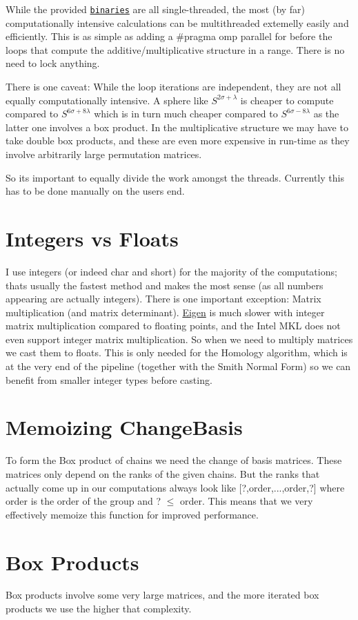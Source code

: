 \begin{DoxyItemize}
\item While the provided \href{https://github.com/NickG-Math/Mackey/tree/master/bin}{\tt binaries} are all single-\/threaded, the most (by far) computationally intensive calculations can be multithreaded extemelly easily and efficiently. This is as simple as adding a {\ttfamily \#pragma omp parallel for} before the loops that compute the additive/multiplicative structure in a range. There is no need to lock anything.
\item There is one caveat\+: While the loop iterations are independent, they are not all equally computationally intensive. A sphere like $S^{2\sigma+\lambda}$ is cheaper to compute compared to $S^{6\sigma+8\lambda}$ which is in turn much cheaper compared to $S^{6\sigma-8\lambda}$ as the latter one involves a box product. In the multiplicative structure we may have to take double box products, and these are even more expensive in run-\/time as they involve arbitrarily large permutation matrices.
\item So it\textquotesingle{}s important to equally divide the work amongst the threads. Currently this has to be done manually on the user\textquotesingle{}s end.
\end{DoxyItemize}\hypertarget{perf_intvsfloat}{}\section{Integers vs Floats}\label{perf_intvsfloat}
I use integers (or indeed {\ttfamily char} and {\ttfamily short}) for the majority of the computations; that\textquotesingle{}s usually the fastest method and makes the most sense (as all numbers appearing are actually integers). There is one important exception\+: Matrix multiplication (and matrix determinant). \hyperlink{namespaceEigen}{Eigen} is much slower with integer matrix multiplication compared to floating points, and the Intel M\+KL does not even support integer matrix multiplication. So when we need to multiply matrices we cast them to floats. This is only needed for the Homology algorithm, which is at the very end of the pipeline (together with the Smith Normal Form) so we can benefit from smaller integer types before casting.\hypertarget{perf_memo}{}\section{Memoizing Change\+Basis}\label{perf_memo}
To form the Box product of chains we need the change of basis matrices. These matrices only depend on the ranks of the given chains. But the ranks that actually come up in our computations always look like \mbox{[}?,order,...,order,?\mbox{]} where order is the order of the group and ? $\le$ order. This means that we very effectively memoize this function for improved performance.\hypertarget{perf_boxproducts}{}\section{Box Products}\label{perf_boxproducts}
Box products involve some very large matrices, and the more iterated box products we use the higher that complexity.


